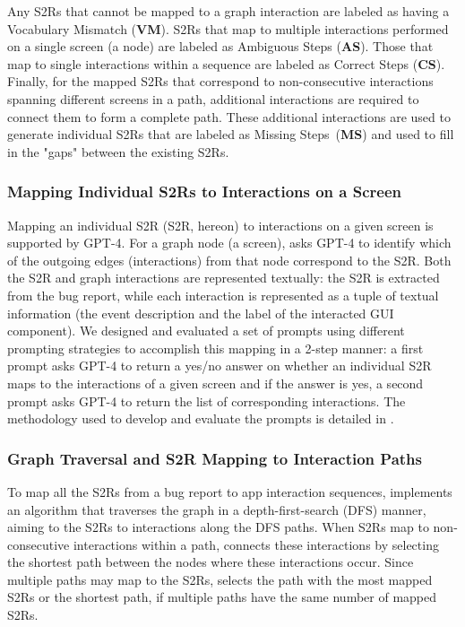 Any S2Rs that cannot be mapped to a graph interaction are labeled as having a Vocabulary Mismatch (\textbf{VM}).  
S2Rs that map to multiple interactions performed on a single screen (\ie a node) are labeled as Ambiguous Steps (\textbf{AS}). 
Those that map to single interactions within a sequence are labeled as Correct Steps (\textbf{CS}). 
Finally, for the mapped S2Rs that correspond to non-consecutive interactions spanning different screens in a path, additional interactions are required to connect them to form a complete path. 
These additional interactions are used to generate individual S2Rs that are labeled as Missing Steps~(\textbf{MS}) and used to fill in the "gaps" between the existing S2Rs.

\subsubsection{Mapping Individual S2Rs to Interactions on a Screen}
\label{sec:qualtiy_phase:mapping_single_screen}
Mapping an individual S2R (S2R, hereon)
to interactions on a given screen is supported by GPT-4. 
For a graph node (\ie a screen), \tool asks GPT-4 to identify which of the outgoing edges (\ie interactions) from that node correspond to the S2R. 
Both the S2R and graph interactions are represented textually: the S2R is extracted from the bug report, while each interaction is represented as a tuple of textual information (\eg the event description and the label of the interacted GUI component).  
We designed and evaluated a set of prompts using different prompting strategies to accomplish this mapping in a 2-step manner: a first prompt asks GPT-4 to return a yes/no answer on whether an individual S2R maps to the interactions of a given screen and if the answer is yes, a second prompt asks GPT-4 to return the list of corresponding interactions. The methodology used to develop and evaluate the prompts is detailed in . 

\subsubsection{Graph Traversal and S2R Mapping to Interaction Paths}
\label{sec:graph-traversal}

To map all the S2Rs from a bug report to app interaction sequences, \tool implements an algorithm that traverses the graph in a depth-first-search (DFS) manner, aiming to  the S2Rs to interactions along the DFS paths. 
When S2Rs map to non-consecutive interactions within a path, \tool connects these interactions by selecting the shortest path between the nodes where these interactions occur. 
Since multiple paths may map to the S2Rs, \tool selects the path with the most mapped S2Rs or the shortest path, if multiple paths have the same number of mapped S2Rs.

